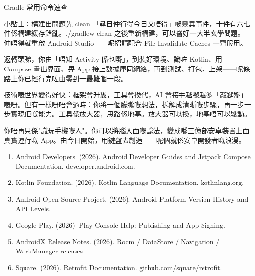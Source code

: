\begin{center}\small\color{gray}Gradle 常用命令速查\end{center}

\begin{tcbinfo}{小貼士：構建出問題先 clean}
「尋日仲行得今日又唔得」嘅靈異事件，十件有六七件係構建緩存錯亂。./gradlew clean 之後重新構建，可以醫好一大半玄學問題。仲唔得就重啟 Android Studio——呢招請配合 File Invalidate Caches 一齊服用。

\end{tcbinfo}



返轉頭睇，你由「唔知 Activity 係乜嘢」，到裝好環境、識咗 Kotlin、用 Compose 畫出界面、畀 App 接上數據庫同網絡，再到測試、打包、上架——呢條路上你已經行完咗由零到一最難嗰一段。

技術嘅世界變得好快：框架會升級，工具會換代，AI 會接手越嚟越多「敲鍵盤」嘅嘢。但有一樣嘢唔會過時：你將一個朦朧嘅想法，拆解成清晰嘅步驟，再一步一步實現佢嘅能力。工具係放大器，思路係地基。放大器可以換，地基唔可以鬆動。

你唔再只係"識玩手機嘅人"。你可以將腦入面嘅諗法，變成喺三億部安卓裝置上面真實運行嘅 App。由今日開始，用鍵盤去創造——呢個就係安卓開發者嘅浪漫。


\begin{enumerate}
  \item Android Developers. (2026). Android Developer Guides and Jetpack Compose Documentation. developer.android.com.
  \item Kotlin Foundation. (2026). Kotlin Language Documentation. kotlinlang.org.
  \item Android Open Source Project. (2026). Android Platform Version History and API Levels.
  \item Google Play. (2026). Play Console Help: Publishing and App Signing.
  \item AndroidX Release Notes. (2026). Room / DataStore / Navigation / WorkManager releases.
  \item Square. (2026). Retrofit Documentation. github.com/square/retrofit.
\end{enumerate}
